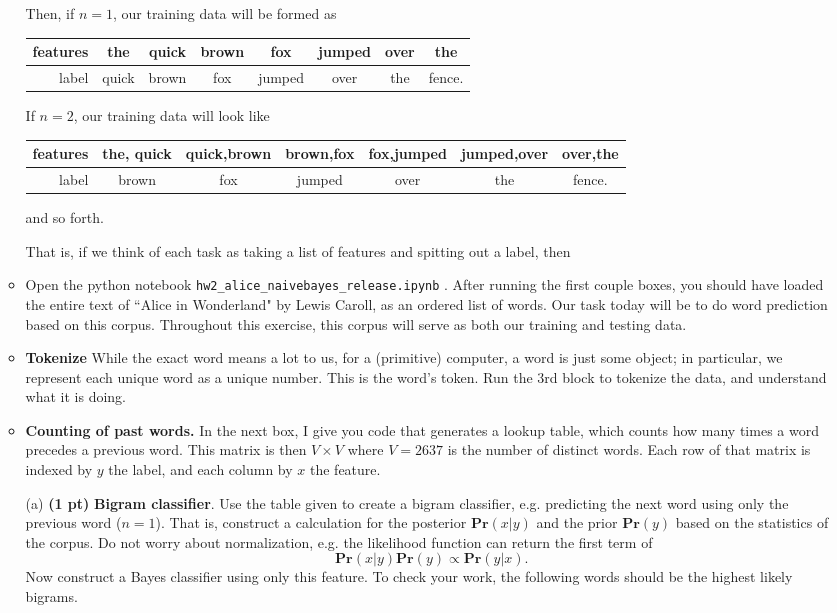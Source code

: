 \documentclass{article}
\newcommand{\pr}{\mathbf{Pr}}
\newcommand{\showpoints}[1]{\textbf{(#1)}}
\begin{document}
\begin{enumerate}
\begin{itemize}
Then, if $n = 1$, our training data will be formed as

\begin{center}
\begin{tabular}{r||c|c|c|c|c|c|c}
features & the & quick & brown & fox & jumped & over & the\\\hline
label & quick & brown & fox & jumped & over & the & fence.
\end{tabular}
\end{center}
If $n = 2$, our training data will look like

\begin{center}
\begin{tabular}{r||c|c|c|c|c|c}
features &  the, quick & quick,brown & brown,fox & fox,jumped & jumped,over & over,the\\\hline
label &  brown & fox & jumped & over & the & fence.
\end{tabular}
\end{center}

and so forth.


That is, if we think of each task as taking a list of features and spitting out a label, then 

\item Open the python notebook \texttt{hw2\_alice\_naivebayes\_release.ipynb} . After running the first couple boxes, you should have loaded the entire text of ``Alice in Wonderland" by Lewis Caroll, as an ordered list of words. Our task today will be to do word prediction based on this corpus. Throughout this exercise, this corpus will serve as both our training and testing data. 

\item \textbf{Tokenize} While the exact word means a lot to us, for a (primitive) computer, a word is just some object; in particular, we represent each unique word as a unique number. This is the word's token. Run the 3rd block to tokenize the data, and understand what it is doing. 

\item \textbf{Counting of past words.} In the next box, I give you code that generates a lookup table, which counts how many times a word precedes a previous word. This matrix is then $V\times V$ where $V = 2637$ is the number of distinct words. Each row of that matrix is indexed by $y$ the label, and each column by $x$ the feature.

\item[(a)]\showpoints{1 pt}  \textbf{Bigram classifier}. Use the table given to create a bigram classifier, e.g. predicting the next word using only the previous word ($n=1$). That is, construct a calculation for the posterior $\pr(x|y)$ and the prior $\pr(y)$ based on the statistics of the corpus. Do not worry about normalization, e.g. the likelihood function can return the first term of
\[
\pr(x|y)\pr(y)\propto \pr(y|x).
\]
Now construct a Bayes classifier using only this feature.
To check your work, the following words should be the highest likely bigrams.


\end{itemize}
\end{enumerate}
\end{document}
